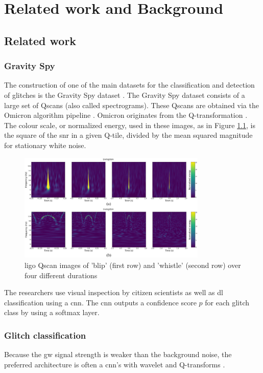 \chapter{Related work and Background}
\label{ch-2}
\section{Related work}
\subsection{Gravity Spy}
The construction of one of the main datasets for the classification and detection of glitches is the Gravity Spy dataset \citep{zevin2017gravity, glanzer2023data}. 
The Gravity Spy dataset consists of a large set of Qscans (also called spectrograms). These Qscans are obtained via the Omicron algorithm pipeline \citep{robinet2020omicron}. Omicron originates from the Q-transformation \citep{chatterji2004multiresolution}. The colour scale, or normalized energy, used in these images, as in Figure \ref{fig:spectrogram_examples}, is the square of the \acrshort{snr} in a given Q-tile, divided by the mean squared magnitude for stationary white noise.
\begin{figure}[H]
    \centering
    \includegraphics[width=0.8\textwidth]{Images/omegascan_examples.jpg}
    \caption{\acrshort{ligo} Qscan images of 'blip' (first row) and 'whistle' (second row) over four different durations \citep{zevin2017gravity}}
    \label{fig:spectrogram_examples}
\end{figure}
The researchers use visual inspection by citizen scientists as well as \acrshort{dl} classification using a \acrshort{cnn}. The \acrshort{cnn} outputs a confidence score $p$ for each glitch class by using a softmax layer. \\

\subsection{Glitch classification}
Because the \acrshort{gw} signal strength is weaker than the background noise, the preferred architecture is often a \acrshort{cnn}'s with wavelet and Q-transforms \cite{cuoco2020enhancing}. 

